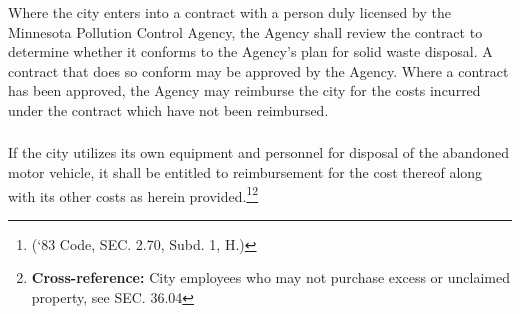 \subsubsection{}
Where the city enters into a contract with a person duly licensed by the Minnesota Pollution Control Agency, the Agency shall review the contract to determine whether it conforms to the Agency’s plan for solid waste disposal.  A contract that does so conform may be approved by the Agency.  Where a contract has been approved, the Agency may reimburse the city for the costs incurred under the contract which have not been reimbursed.
\subsubsection{}
If the city utilizes its own equipment and personnel for disposal of the abandoned motor vehicle, it shall be entitled to reimbursement for the cost thereof along with its other costs as herein provided.\footnote{(‘83 Code, SEC. 2.70, Subd. 1, H.)}\footnote{\textbf{Cross-reference:} City employees who may not purchase excess or unclaimed property, see SEC. 36.04}
